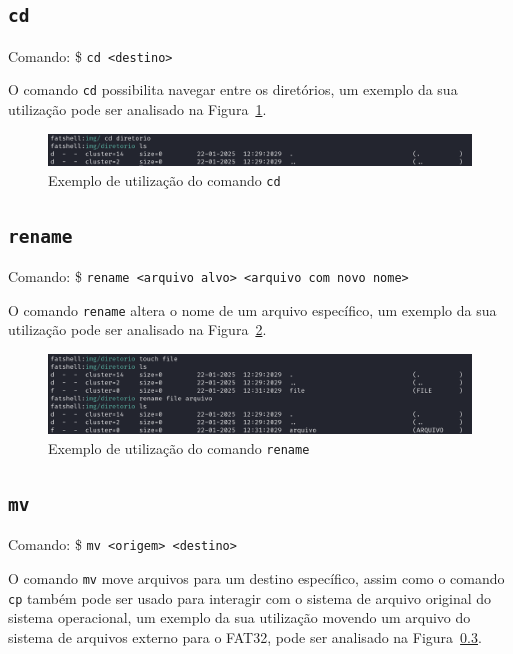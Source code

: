 \documentclass[
    12pt,				%
    oneside,   	        %
    a4paper,			%
    english,			%
    french,				%
    spanish,			%
    brazil,				%
    ]{pacotes/abntex2}
\begin{document}

\subsection{\texttt{cd}}
\label{subsec:cd}
Comando: \$ \texttt{cd <destino>}

O comando \texttt{cd} possibilita navegar entre os diretórios, um exemplo da sua utilização pode ser analisado na Figura~\ref{fig:cd}.
 
\begin{figure}[H]
    \centering
    \includegraphics[width=450pt]{figuras/resultados/10-cd.PNG}
    \caption{Exemplo de utilização do comando \texttt{cd}}
    \label{fig:cd}
\end{figure}


\subsection{\texttt{rename}}
\label{subsec:rename}
Comando: \$ \texttt{rename <arquivo alvo> <arquivo com novo nome>}

O comando \texttt{rename} altera o nome de um arquivo específico, um exemplo da sua utilização pode ser analisado na Figura~\ref{fig:rename}.

\begin{figure}[H]
    \centering
    \includegraphics[width=450pt]{figuras/resultados/11-rename.PNG}
    \caption{Exemplo de utilização do comando \texttt{rename}}
    \label{fig:rename}
\end{figure}


\subsection{\texttt{mv}}
\label{subsec:mv}
Comando: \$ \texttt{mv <origem> <destino>}

O comando \texttt{mv} move arquivos para um destino específico, assim como o comando \texttt{cp} também pode ser usado para interagir com o sistema de arquivo original do sistema operacional, um exemplo da sua utilização movendo um arquivo do sistema de arquivos externo para o FAT32, pode ser analisado na Figura~\ref{subsec:mv}.
\end{document}
